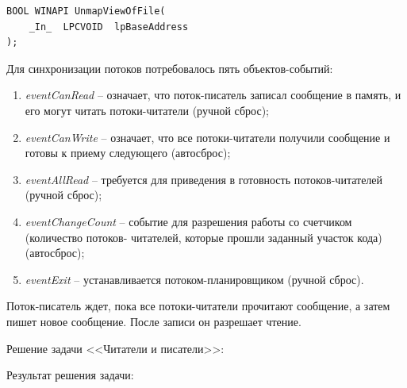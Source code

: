 \documentclass[14pt,a4paper,report]{report}
\begin{document}
\begin{verbatim}
BOOL WINAPI UnmapViewOfFile(
    _In_  LPCVOID  lpBaseAddress
);
\end{verbatim}

Для синхронизации потоков потребовалось пять объектов-событий:

\begin{enumerate}
	\item \emph{eventCanRead} – означает, что поток-писатель записал сообщение в память, и его могут читать потоки-читатели (ручной сброс); 

	\item \emph{eventCanWrite} – означает, что все потоки-читатели получили сообщение и готовы к приему следующего (автосброс); 

	\item \emph{eventAllRead} – требуется для приведения в готовность потоков-читателей (ручной сброс); 

	\item \emph{eventChangeCount} – событие для разрешения работы со счетчиком (количество потоков- читателей, которые прошли заданный участок кода) (автосброс); 

	\item \emph{eventExit} – устанавливается потоком-планировщиком (ручной сброс).
\end{enumerate}

Поток-писатель ждет, пока все потоки-читатели прочитают сообщение, а затем пишет новое сообщение. После записи он разрешает чтение.

\clearpage

Решение задачи <<Читатели и писатели>>:



\clearpage

Результат решения задачи:
\end{document}
